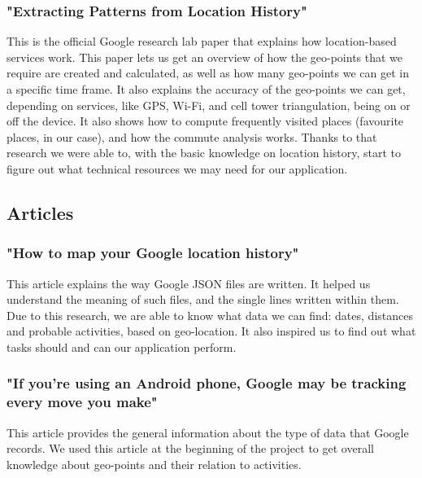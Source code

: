 \documentclass[12p]{article}
\begin{document}
\subsubsection["Extracting Patterns from Location History"]{"Extracting Patterns from Location History" \cite{GoogleLabPaper}}

This is the official Google research lab paper that explains how location-based services work. This paper lets us get an overview of how the geo-points that we require are created and calculated, as well as how many geo-points we can get in a specific time frame. It also explains the accuracy of the geo-points we can get, depending on services, like GPS, Wi-Fi, and cell tower triangulation, being on or off the device. It also shows how to compute frequently visited places (favourite places, in our case), and how the commute analysis works. Thanks to that research we were able to, with the basic knowledge on location history, start to figure out what technical resources we may need for our application.

\newpage

\subsection{Articles}
\subsubsection["How to map your Google location history"]{"How to map your Google location history" \cite{HowToMapArtc}}

This article explains the way Google JSON files are written. It helped us understand the meaning of such files, and the single lines written within them. Due to this research, we are able to know what data we can find: dates, distances and probable activities, based on geo-location. It also inspired us to find out what tasks should and can our application perform.

\subsubsection["If you’re using an Android phone, Google may be tracking every move you make"]{"If you’re using an Android phone, Google may be tracking every move you make" \cite{IfYoureArtc}}

This article provides the general information about the type of data that Google records. We used this article at the beginning of the project to get overall knowledge about geo-points and their relation to activities.
\end{document}
